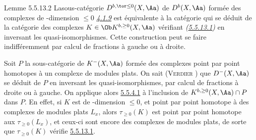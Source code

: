\begin{enonce*}{Lemme 5.5.13.2}
La\pageoriginale sous-catégorie $D^{b,\tor\leq 0}(X,\Aa)$ de
$D^{b}(X,\Aa)$ formée des complexes de \tTor-dimension $\leq 0$ \emph{\hyperref[XVII.def4.1.9]{4.1.9}}
est équivalente à la catégorie qui se déduit de la catégorie des
complexes $K\in \Ob K^{b,\geq 0}(X,\Aa)$ vérifiant
\emph{(\hyperref[XVII.par5.5.13.1]{5.5.13.1})} en inversant les quasi-isomorphismes. Cette
construction peut se faire indifféremment par calcul de fractions à gauche ou à droite.
\end{enonce*}

Soit $P$ la sous-catégorie de $K^{-}(X,\Aa)$ formée des
complexes point par point homotopes à un complexe de modules plats. On
sait (\textsc{Verdier} ) que $D^{-}(X,\Aa)$ se déduit de $P$ en
inversant les quasi-isomorphismes, par calcul de fractions à droite ou
à gauche. On applique alors \hyperref[XVII.lem5.5.4.1]{5.5.4.1} à l'inclusion de $K^{b,\geq
0}(X,\Aa)\cap P$ dans $P$. En effet, si $K$ est de
\tTor-dimension $\leq 0$, et point par point homotope à des complexes de
modules plats $L_{x}$, alors $\tau_{\geq 0}(K)$ est point par point
homotope aux $\tau_{\geq 0}(L_{x})$, et ceux-ci sont encore des
complexes de modules plats, de sorte que $\tau_{\geq 0}(K)$ vérifie
\hyperref[XVII.par5.5.13.1]{5.5.13.1}.

